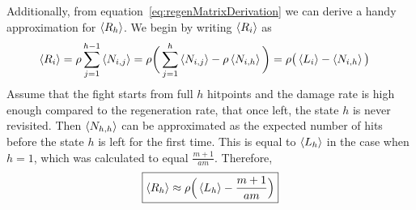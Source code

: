 Additionally, from equation~\ref{eq:regenMatrixDerivation} we can derive a handy approximation for $\left\langle R_h \right\rangle$. We begin by writing $\left\langle R_i \right\rangle$ as
\begin{align}
	\left\langle R_i \right\rangle
		&= \rho\sum_{j=1}^{h-1}\left\langle N_{i,j} \right\rangle
		= \rho\bigg(\sum_{j=1}^{h}\left\langle N_{i,j} \right\rangle - \rho\left\langle N_{i,h} \right\rangle\bigg)\nonumber
		= \rho\big(\left\langle L_i \right\rangle - \left\langle N_{i,h} \right\rangle\big)\label{eq:regenIntuitive}
\end{align}
Assume that the fight starts from full $h$ hitpoints and the damage rate is high enough compared to the regeneration rate, that once left, the state $h$ is never revisited. Then $\left\langle N_{h,h} \right\rangle$ can be approximated as the expected number of hits before the state $h$ is left for the first time. This is equal to $\left\langle L_h \right\rangle$ in the case when $h=1$, which was calculated to equal $\frac{m+1}{am}$. Therefore,
\begin{align}
	\boxed{\left\langle R_h \right\rangle
		\approx \rho\Big(\left\langle L_h \right\rangle - \frac{m+1}{am}\Big)
	}
\end{align}
